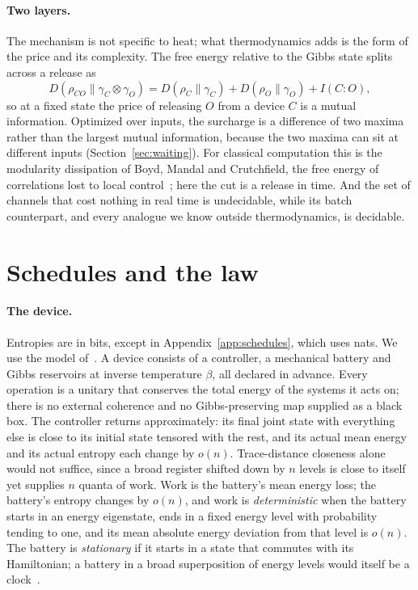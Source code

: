 \documentclass[11pt]{article}
\theoremstyle{definition}
\theoremstyle{remark}
\begin{document}
\paragraph{Two layers.} The mechanism is not specific to heat; what thermodynamics adds is the form of the price and its complexity. The free energy relative to the Gibbs state splits across a release as
\[
D(\rho_{CO}\|\gamma_C\otimes\gamma_O)=D(\rho_C\|\gamma_C)+D(\rho_O\|\gamma_O)+I(C{:}O),
\]
so at a fixed state the price of releasing $O$ from a device $C$ is a mutual information. Optimized over inputs, the surcharge is a difference of two maxima rather than the largest mutual information, because the two maxima can sit at different inputs (Section~\ref{sec:waiting}). For classical computation this is the modularity dissipation of Boyd, Mandal and Crutchfield, the free energy of correlations lost to local control~\cite{BMC18}; here the cut is a release in time. And the set of channels that cost nothing in real time is undecidable, while its batch counterpart, and every analogue we know outside thermodynamics, is decidable.

\section{Schedules and the law}\label{sec:law}

\paragraph{The device.} Entropies are in bits, except in Appendix~\ref{app:schedules}, which uses nats. We use the model of~\cite[Sec.~2]{SaveWork}. A device consists of a controller, a mechanical battery and Gibbs reservoirs at inverse temperature $\beta$, all declared in advance. Every operation is a unitary that conserves the total energy of the systems it acts on; there is no external coherence and no Gibbs-preserving map supplied as a black box. The controller returns approximately: its final joint state with everything else is close to its initial state tensored with the rest, and its actual mean energy and its actual entropy each change by $o(n)$. Trace-distance closeness alone would not suffice, since a broad register shifted down by $n$ levels is close to itself yet supplies $n$ quanta of work. Work is the battery's mean energy loss; the battery's entropy changes by $o(n)$, and work is \emph{deterministic} when the battery starts in an energy eigenstate, ends in a fixed energy level with probability tending to one, and its mean absolute energy deviation from that level is $o(n)$. The battery is \emph{stationary} if it starts in a state that commutes with its Hamiltonian; a battery in a broad superposition of energy levels would itself be a clock~\cite{SaveWork}.
\end{document}
